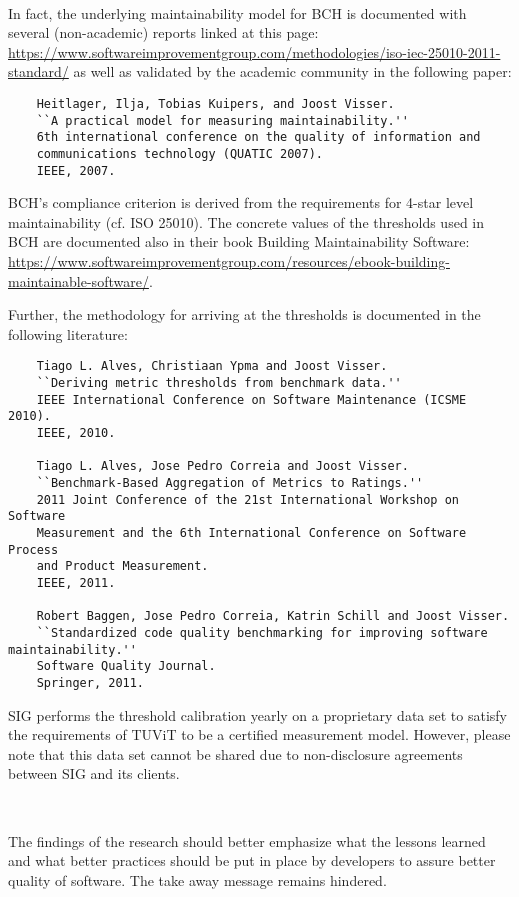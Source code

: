 \documentclass[11pt,fleqn]{article}
\newcommand{\eline}{\vspace*{.75\baselineskip}}
\newcommand{\Referee}[1]{\eline \noindent {\bf Reviewer comment #1:} \\}
\newcommand{\Us}{\eline \noindent {\bf Response:}\\}
\newenvironment{revcomment}[1][]
{\Referee{#1}\begin{rcomment}}
{\end{rcomment}}
\begin{document}
\Us 

In fact, the underlying maintainability model for BCH is documented with several
(non-academic) reports linked at this page:
\url{https://www.softwareimprovementgroup.com/methodologies/iso-iec-25010-2011-standard/} as 
well as validated by the academic community in the following paper:

\begin{verbatim}
    Heitlager, Ilja, Tobias Kuipers, and Joost Visser. 
    ``A practical model for measuring maintainability.'' 
    6th international conference on the quality of information and 
    communications technology (QUATIC 2007). 
    IEEE, 2007.
\end{verbatim}

BCH's compliance criterion is derived from the requirements for 4-star level maintainability (cf. ISO 25010). 
The concrete values of the thresholds used in BCH are documented also in their book Building Maintainability 
Software: \url{https://www.softwareimprovementgroup.com/resources/ebook-building-maintainable-software/}.

Further, the methodology for arriving at the thresholds is documented in the following 
literature:

\begin{verbatim}
    Tiago L. Alves, Christiaan Ypma and Joost Visser. 
    ``Deriving metric thresholds from benchmark data.'' 
    IEEE International Conference on Software Maintenance (ICSME 2010). 
    IEEE, 2010.

    Tiago L. Alves, Jose Pedro Correia and Joost Visser. 
    ``Benchmark-Based Aggregation of Metrics to Ratings.'' 
    2011 Joint Conference of the 21st International Workshop on Software 
    Measurement and the 6th International Conference on Software Process 
    and Product Measurement. 
    IEEE, 2011.

    Robert Baggen, Jose Pedro Correia, Katrin Schill and Joost Visser. 
    ``Standardized code quality benchmarking for improving software maintainability.'' 
    Software Quality Journal.
    Springer, 2011.

\end{verbatim}

SIG performs the threshold calibration
yearly on a proprietary data set to satisfy the requirements of TUViT to
be a certified measurement model. However, please note that this data set 
cannot be shared due to non-disclosure agreements between SIG and its 
clients.


\begin{revcomment}[3.3]

    The findings of the research should better emphasize what the 
    lessons learned and what better practices should be put in place 
    by developers to assure better quality of software. The take away 
    message remains hindered. 

\end{revcomment}

\Us 
\end{document}
